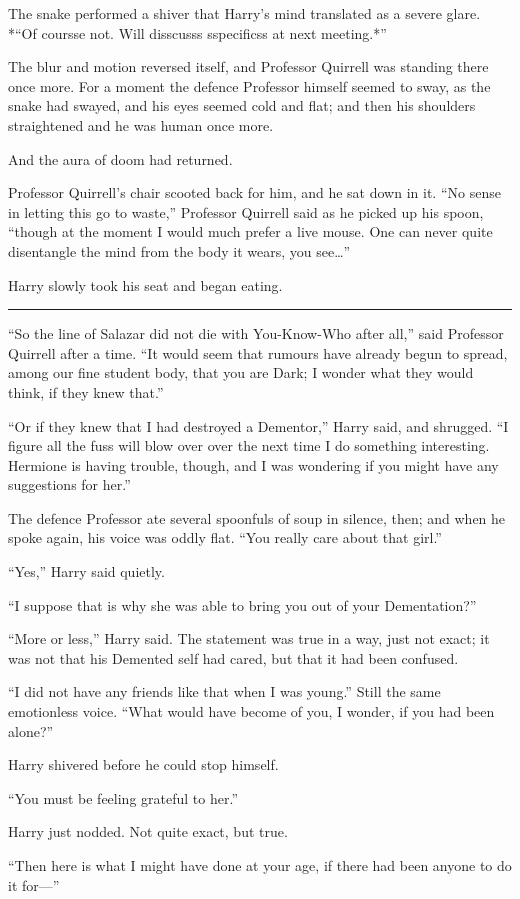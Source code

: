 The snake performed a shiver that Harry's mind translated as a severe
glare. *``Of coursse not. Will disscusss sspecificss at next meeting.*''

The blur and motion reversed itself, and Professor Quirrell was standing
there once more. For a moment the defence Professor himself seemed to
sway, as the snake had swayed, and his eyes seemed cold and flat; and
then his shoulders straightened and he was human once more.

And the aura of doom had returned.

Professor Quirrell's chair scooted back for him, and he sat down in it.
``No sense in letting this go to waste,'' Professor Quirrell said as he
picked up his spoon, ``though at the moment I would much prefer a live
mouse. One can never quite disentangle the mind from the body it wears,
you see\ldots{}''

Harry slowly took his seat and began eating.

\begin{center}\rule{3in}{0.4pt}\end{center}

``So the line of Salazar did not die with You-Know-Who after all,'' said
Professor Quirrell after a time. ``It would seem that rumours have
already begun to spread, among our fine student body, that you are Dark;
I wonder what they would think, if they knew that.''

``Or if they knew that I had destroyed a Dementor,'' Harry said, and
shrugged. ``I figure all the fuss will blow over over the next time I do
something interesting. Hermione is having trouble, though, and I was
wondering if you might have any suggestions for her.''

The defence Professor ate several spoonfuls of soup in silence, then;
and when he spoke again, his voice was oddly flat. ``You really care
about that girl.''

``Yes,'' Harry said quietly.

``I suppose that is why she was able to bring you out of your
Dementation?''

``More or less,'' Harry said. The statement was true in a way, just not
exact; it was not that his Demented self had cared, but that it had been
confused.

``I did not have any friends like that when I was young.'' Still the
same emotionless voice. ``What would have become of you, I wonder, if
you had been alone?''

Harry shivered before he could stop himself.

``You must be feeling grateful to her.''

Harry just nodded. Not quite exact, but true.

``Then here is what I might have done at your age, if there had been
anyone to do it for---''
